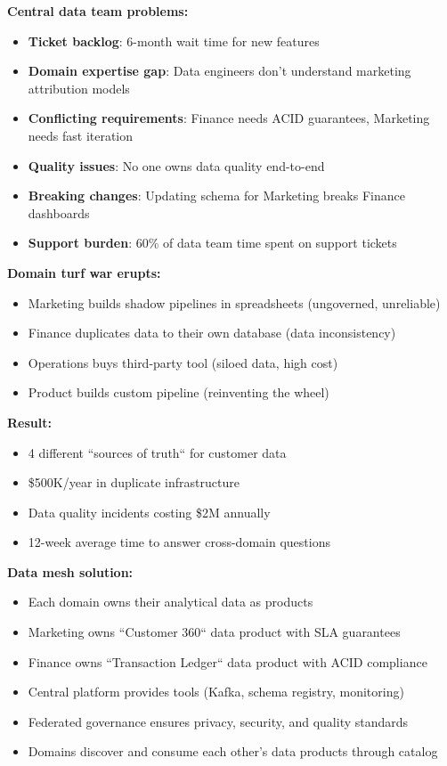 \textbf{Central data team problems:}
\begin{itemize}
    \item \textbf{Ticket backlog}: 6-month wait time for new features
    \item \textbf{Domain expertise gap}: Data engineers don't understand marketing attribution models
    \item \textbf{Conflicting requirements}: Finance needs ACID guarantees, Marketing needs fast iteration
    \item \textbf{Quality issues}: No one owns data quality end-to-end
    \item \textbf{Breaking changes}: Updating schema for Marketing breaks Finance dashboards
    \item \textbf{Support burden}: 60\% of data team time spent on support tickets
\end{itemize}

\textbf{Domain turf war erupts:}
\begin{itemize}
    \item Marketing builds shadow pipelines in spreadsheets (ungoverned, unreliable)
    \item Finance duplicates data to their own database (data inconsistency)
    \item Operations buys third-party tool (siloed data, high cost)
    \item Product builds custom pipeline (reinventing the wheel)
\end{itemize}

\textbf{Result:}
\begin{itemize}
    \item 4 different ``sources of truth`` for customer data
    \item \$500K/year in duplicate infrastructure
    \item Data quality incidents costing \$2M annually
    \item 12-week average time to answer cross-domain questions
\end{itemize}

\textbf{Data mesh solution:}
\begin{itemize}
    \item Each domain owns their analytical data as products
    \item Marketing owns ``Customer 360`` data product with SLA guarantees
    \item Finance owns ``Transaction Ledger`` data product with ACID compliance
    \item Central platform provides tools (Kafka, schema registry, monitoring)
    \item Federated governance ensures privacy, security, and quality standards
    \item Domains discover and consume each other's data products through catalog
\end{itemize}

